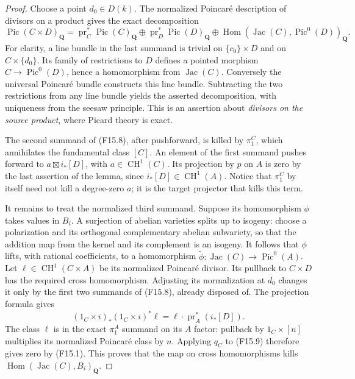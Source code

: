\documentclass[11pt]{article}
\theoremstyle{remark}\newtheorem{remark}[theorem]{Remark}
\begin{document}
\begin{proof}
Choose a point $d_0\in D(k)$.  The normalized Poincar\'e
description of divisors on a product gives the exact decomposition
\[
 \operatorname{Pic}(C\times D)_{\mathbf Q}
 =\operatorname{pr}_C^*\operatorname{Pic}(C)_{\mathbf Q}
 \oplus\operatorname{pr}_D^*\operatorname{Pic}(D)_{\mathbf Q}
 \oplus\operatorname{Hom}(\operatorname{Jac}(C),
                          \operatorname{Pic}^0(D))_{\mathbf Q}.
 \tag{F15.8}
\]
For clarity, a line bundle in the last summand is trivial on
$\{c_0\}\times D$ and on $C\times\{d_0\}$.  Its family of
restrictions to $D$ defines a pointed morphism
$C\to\operatorname{Pic}^0(D)$, hence a homomorphism from
$\operatorname{Jac}(C)$.  Conversely the universal Poincar\'e
bundle constructs this line bundle.  Subtracting the two restrictions
from any line bundle yields the asserted decomposition, with
uniqueness from the seesaw principle.  This is an assertion about
\emph{divisors on the source product}, where Picard theory is exact.

The second summand of (F15.8), after pushforward, is killed by
$\pi_1^C$, which annihilates the fundamental class $[C]$.
An element of the first summand pushes forward to
$a\boxtimes i_*[D]$, with $a\in\operatorname{CH}^1(C)$.
Its projection by $p$ on $A$ is zero by the last assertion of the
lemma, since $i_*[D]\in\operatorname{CH}^1(A)$.
Notice that $\pi_1^C$ by itself need not kill a degree-zero
$a$; it is the target projector that kills this term.

It remains to treat the normalized third summand.  Suppose its
homomorphism $\phi$ takes values in $B_i$.  A surjection of abelian
varieties splits up to isogeny: choose a polarization and its
orthogonal complementary abelian subvariety, so that the addition
map from the kernel and its complement is an isogeny.  It follows
that $\phi$ lifts, with rational coefficients, to a homomorphism
$\widetilde\phi:\operatorname{Jac}(C)\to\operatorname{Pic}^0(A)$.
Let $\ell\in\operatorname{CH}^1(C\times A)$ be its normalized
Poincar\'e divisor.  Its pullback to $C\times D$ has the required
cross homomorphism.  Adjusting its normalization at $d_0$ changes
it only by the first two summands of (F15.8), already disposed of.
The projection formula gives
\[
 (1_C\times i)_*(1_C\times i)^*\ell
       =\ell\cdot\operatorname{pr}_A^*(i_*[D]).
 \tag{F15.9}
\]
The class $\ell$ is in the exact $\pi_1^A$ summand on its
$A$ factor: pullback by $1_C\times[n]$ multiplies its normalized
Poincar\'e class by $n$.  Applying $q_C$ to (F15.9) therefore
gives zero by (F15.1).  This proves that the map on cross
homomorphisms kills
$\operatorname{Hom}(\operatorname{Jac}(C),B_i)_{\mathbf Q}$.


\end{proof}
\end{document}
